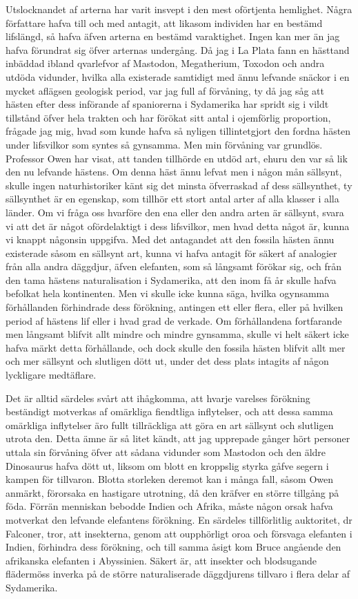 Utslocknandet af arterna har varit insvept i den mest oförtjenta hemlighet. Några författare hafva till och med antagit, att likasom individen har en bestämd lifslängd, så hafva äfven arterna en bestämd varaktighet. Ingen kan mer än jag hafva förundrat sig öfver arternas undergång. Då jag i La Plata fann en hästtand inbäddad ibland qvarlefvor af Mastodon, Megatherium, Toxodon och andra utdöda vidunder, hvilka alla existerade samtidigt med ännu lefvande snäckor i en mycket aflägsen geologisk period, var jag full af förvåning, ty då jag såg att hästen efter dess införande af spaniorerna i Sydamerika har spridt sig i vildt tillstånd öfver hela trakten och har förökat sitt antal i ojemförlig proportion, frågade jag mig, hvad som kunde hafva så nyligen tillintetgjort den fordna hästen under lifsvilkor som syntes så gynsamma. Men min förvåning var grundlös. Professor Owen har visat, att tanden tillhörde en utdöd art, ehuru den var så lik den nu lefvande hästens. Om denna häst ännu lefvat men i någon mån sällsynt, skulle ingen naturhistoriker känt sig det minsta öfverraskad af dess sällsynthet, ty sällsynthet är en egenskap, som tillhör ett stort antal arter af alla klasser i alla länder. Om vi fråga oss hvarföre den ena eller den andra arten är sällsynt, svara vi att det är något ofördelaktigt i dess lifsvilkor, men hvad detta något är, kunna vi knappt någonsin uppgifva. Med det antagandet att den fossila hästen ännu existerade såsom en sällsynt art, kunna vi hafva antagit för säkert af analogier från alla andra däggdjur, äfven elefanten, som så långsamt förökar sig, och från den tama hästens naturalisation i Sydamerika, att den inom få år skulle hafva befolkat hela kontinenten. Men vi skulle icke kunna säga, hvilka ogynsamma förhållanden förhindrade dess förökning, antingen ett eller flera, eller på hvilken period af hästens lif eller i hvad grad de verkade. Om förhållandena fortfarande men långsamt blifvit allt mindre och mindre gynsamma, skulle vi helt säkert icke hafva märkt detta förhållande, och dock skulle den fossila hästen blifvit allt mer och mer sällsynt och slutligen dött ut, under det dess plats intagits af någon lyckligare medtäflare.

Det är alltid särdeles svårt att ihågkomma, att hvarje varelses förökning beständigt motverkas af omärkliga fiendtliga inflytelser, och att dessa samma omärkliga inflytelser äro fullt tillräckliga att göra en art sällsynt och slutligen utrota den. Detta ämne är så litet kändt, att jag upprepade gånger hört personer uttala sin förvåning öfver att sådana vidunder som Mastodon och den äldre Dinosaurus hafva dött ut, liksom om blott en kroppslig styrka gåfve segern i kampen för tillvaron. Blotta storleken deremot kan i många fall, såsom Owen anmärkt, förorsaka en hastigare utrotning, då den kräfver en större tillgång på föda. Förrän menniskan bebodde Indien och Afrika, måste någon orsak hafva motverkat den lefvande elefantens förökning. En särdeles tillförlitlig auktoritet, dr Falconer, tror, att insekterna, genom att oupphörligt oroa och försvaga elefanten i Indien, förhindra dess förökning, och till samma åsigt kom Bruce angående den afrikanska elefanten i Abyssinien. Säkert är, att insekter och blodsugande flädermöss inverka på de större naturaliserade däggdjurens tillvaro i flera delar af Sydamerika.

